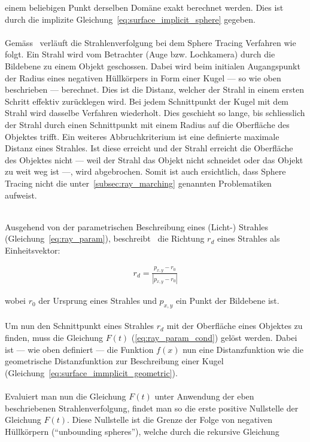 einem beliebigen Punkt derselben Domäne exakt berechnet werden. Dies ist durch
die implizite Gleichung~\ref{eq:surface_implicit_sphere} gegeben.\\
\\
Gemäss~\cite{hart_ray_1989} verläuft die Strahlenverfolgung bei dem Sphere
Tracing Verfahren wie folgt. Ein Strahl wird vom Betrachter (Auge bzw.
Lochkamera) durch die Bildebene zu einem Objekt geschossen. Dabei wird beim
initialen Augangspunkt der Radius eines negativen Hüllkörpers in Form einer
Kugel --- so wie oben beschrieben --- berechnet. Dies ist die Distanz, welcher
der Strahl in einem ersten Schritt effektiv zurücklegen wird. Bei jedem
Schnittpunkt der Kugel mit dem Strahl wird dasselbe Verfahren wiederholt. Dies
geschieht so lange, bis schliesslich der Strahl durch einen Schnittpunkt mit
einem Radius auf die Oberfläche des Objektes trifft. Ein weiteres
Abbruchkriterium ist eine definierte maximale Distanz eines Strahles. Ist diese
erreicht und der Strahl erreicht die Oberfläche des Objektes nicht --- weil der
Strahl das Objekt nicht schneidet oder das Objekt zu weit weg ist ---, wird
abgebrochen. Somit ist auch ersichtlich, dass Sphere Tracing nicht die
unter~\ref{subsec:ray_marching} genannten Problematiken aufweist.\\
\\

Ausgehend von der parametrischen Beschreibung eines (Licht-) Strahles
(Gleichung~\ref{eq:ray_param}), beschreibt~\cite{hart_sphere_1994} die Richtung
$r_{d}$ eines Strahles als Einheitsvektor:

\begin{gather}
    r_{d} = \frac{p_{x, y} - r_{0}}{|p_{x, y} - r_{0}|}
\end{gather}

wobei $r_{0}$ der Ursprung eines Strahles und $p_{x, y}$ ein Punkt der Bildebene ist.\\
\\
Um nun den Schnittpunkt eines Strahles $r_{d}$ mit der Oberfläche eines
Objektes zu finden, muss die Gleichung $F(t)$ (\ref{eq:ray_param_cond}) gelöst
werden. Dabei ist --- wie oben definiert --- die Funktion $f(x)$ nun eine
Distanzfunktion wie die geometrische Distanzfunktion zur Beschreibung einer
Kugel (Gleichung~\ref{eq:surface_immplicit_geometric}).\\
\\
Evaluiert man nun die Gleichung $F(t)$ unter Anwendung der eben beschriebenen
Strahlenverfolgung, findet man so die erste positive Nullstelle der Gleichung
$F(t)$. Diese Nullstelle ist die Grenze der Folge von negativen Hüllkörpern
(``unbounding spheres''), welche durch die rekursive Gleichung

